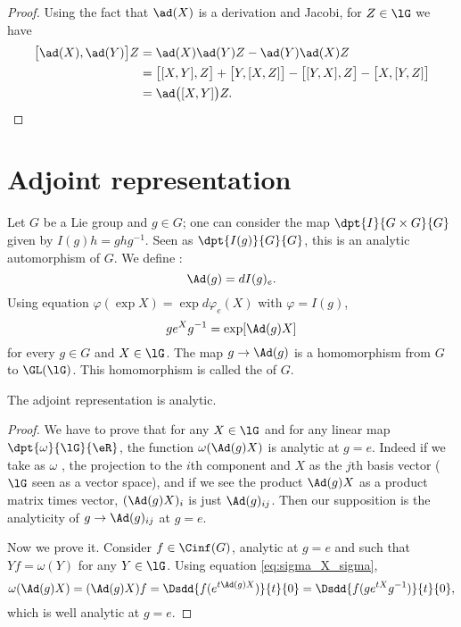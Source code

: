 \begin{proof}
    Using the fact that \( \ad(X)\) is a derivation and Jacobi, for \( Z\in\lG\) we have
    \begin{subequations}
        \begin{align}
            \big[ \ad(X),\ad(Y) \big]Z&=\ad(X)\ad(Y)Z-\ad(Y)\ad(X)Z\\
            &=\big[ [X,Y],Z \big]+\big[ Y,[X,Z] \big]-\big[ [Y,X],Z \big]-\big[ X,[Y,Z] \big]\\
            &=\ad\big( [X,Y] \big)Z.
        \end{align}
    \end{subequations}
\end{proof}

\section{Adjoint representation}

Let $G$ be a Lie group and $g\in G$; one can consider the map $\dpt{I}{G\times G}{G}$ given by $I(g)h=g hg^{-1}$. Seen as $\dpt{I(g)}{G}{G}$, this is an analytic automorphism of $G$. We define :
\[
    \Ad(g)=dI(g)_e.
\]
Using equation $\varphi(\exp X)=\exp d\varphi_e(X)$ with $\varphi=I(g)$,
\begin{equation}\label{eq:sigma_X_sigma}
  g e^{X}g^{-1}=\exp[ \Ad(g)X ]
\end{equation}
for every $g\in G$ and $X\in\lG$. The map $g\to\Ad(g)$ is a homomorphism from $G$ to $\GL(\lG)$. This homomorphism is called the  of $G$.

\begin{proposition}
The adjoint representation is analytic.
\end{proposition}

\begin{proof}
We have to prove that for any $X\in\lG$ and for any linear map $\dpt{\omega}{\lG}{\eR}$, the function $\omega(\Ad(g)X)$ is analytic at $g=e$. Indeed if we take as $\omega$ , the projection to the $i$th component and $X$ as the $j$th basis vector ($\lG$ seen as a vector space), and if we see the product $\Ad(g)X$ as a product matrix times vector, $(\Ad(g)X)_i$ is just $\Ad(g)_{ij}$. Then our supposition is the analyticity of $g\to\Ad(g)_{ij}$ at $g=e$. 

Now we prove it. Consider $f\in\Cinf(G)$, analytic at $g=e$ and such that $Yf=\omega(Y)$ for any $Y\in\lG$. Using equation \eqref{eq:sigma_X_sigma}, 
\begin{equation}
  \omega(\Ad(g)X)=(\Ad(g)X)f
                      =\Dsdd{ f(e^{t\Ad(g)X}) }{t}{0}
                      =\Dsdd{ f(g e^{tX}g^{-1}) }{t}{0},
\end{equation}
which is well analytic at $g=e$.
\end{proof}


